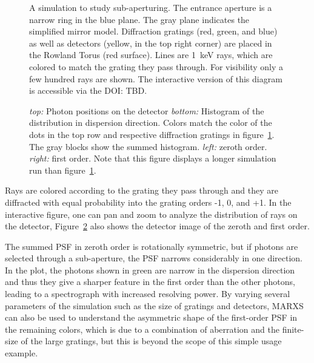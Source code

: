\documentclass[twocolumn]{aastex61}
\begin{document}
\begin{figure}[ht!]
\caption{A simulation to study sub-aperturing. The entrance aperture is a
  narrow ring in the blue plane. The gray plane indicates the simplified
  mirror model. Diffraction gratings (red, green, and blue) as well as
  detectors (yellow, in the top right corner) are placed in the Rowland Torus
  (red surface). Lines are 1~keV rays, which are colored to match the grating
  they pass through. For visibility only a few hundred rays are shown. The
  interactive version of this diagram is accessible via the DOI: TBD.}
    \label{fig:subaper3d}
\end{figure}


\begin{figure}[ht!]
\caption{\emph{top:} Photon positions on the detector \emph{bottom:} Histogram
  of the distribution in dispersion direction. Colors match the color of the
  dots in the top row and respective diffraction gratings in
  figure~\ref{fig:subaper3d}. The gray blocks show the summed
  histogram. \emph{left:} zeroth order. \emph{right:} first order. Note that
  this figure displays a longer simulation run than figure~\ref{fig:subaper3d}.}
    \label{fig:subaper}
\end{figure}



Rays are colored according to the grating they pass
through and they are diffracted with equal probability into the grating orders
-1, 0, and +1. In the interactive figure, one can pan and zoom to analyze the
distribution of rays on the detector, Figure~\ref{fig:subaper} also shows the
detector image of the zeroth and first order. 

The summed PSF in zeroth order is rotationally symmetric, but if photons are
selected through a sub-aperture, the PSF narrows considerably in one
direction. In the plot, the photons shown in green are narrow in the dispersion
direction and thus they give a sharper feature in the first order than the
other photons, leading to a spectrograph with increased resolving power. By
varying several parameters of the simulation such as the size of gratings and
detectors, MARXS can also be used to understand the asymmetric shape of the
first-order PSF in the remaining colors, which is due to a combination of
aberration and the finite-size of the large gratings, but this is beyond the
scope of this simple usage example.
\end{document}
